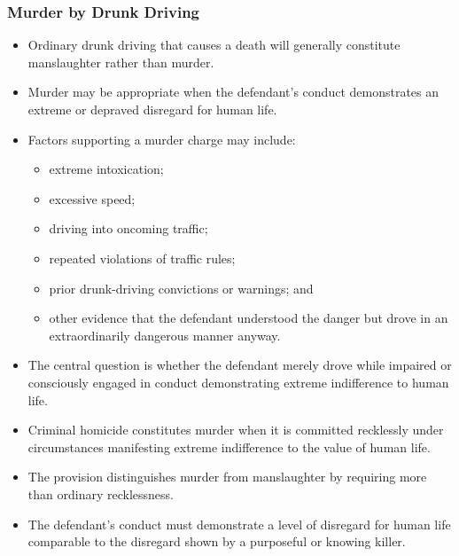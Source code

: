 \documentclass[11pt]{tex/lawoutline}
\begin{document}
\subsubsection{Murder by Drunk Driving}
{
\begin{itemize}
    \item Ordinary drunk driving that causes a death will generally constitute manslaughter rather than murder.
    \item Murder may be appropriate when the defendant's conduct demonstrates an extreme or depraved disregard for human life.
    \item Factors supporting a murder charge may include:
    \begin{itemize}
        \item extreme intoxication;
        \item excessive speed;
        \item driving into oncoming traffic;
        \item repeated violations of traffic rules;
        \item prior drunk-driving convictions or warnings; and
        \item other evidence that the defendant understood the danger but drove in an extraordinarily dangerous manner anyway.
    \end{itemize}
    \item The central question is whether the defendant merely drove while impaired or consciously engaged in conduct demonstrating extreme indifference to human life.
\end{itemize}
}

{
\begin{itemize}
    \item Criminal homicide constitutes murder when it is committed recklessly under circumstances manifesting extreme indifference to the value of human life.
    \item The provision distinguishes murder from manslaughter by requiring more than ordinary recklessness.
    \item The defendant's conduct must demonstrate a level of disregard for human life comparable to the disregard shown by a purposeful or knowing killer.
\end{itemize}
}
\end{document}
